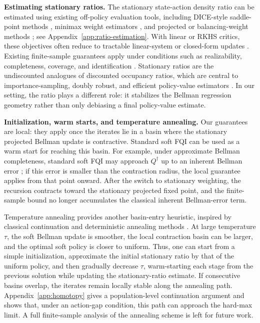 \documentclass{article}
\theoremstyle{plain}
\theoremstyle{definition}
\theoremstyle{remark}
\begin{document}
\textbf{Estimating stationary ratios.}
The stationary state-action density ratio can be estimated using existing
off-policy evaluation tools, including DICE-style saddle-point methods
\citep{liu2018breaking,nachum2019dualdice,nachum2019algaedice,
zhang2020gendice,lee2021optidice,lee2022coptidice}, minimax weight estimators
\citep{uehara2020minimax,uehara2021finite}, and projected or balancing-weight
methods \citep{wang2023projected}; see Appendix~\ref{app:ratio-estimation}.
With linear or RKHS critics, these objectives often reduce to tractable
linear-system or closed-form updates
\citep{dikkala2020minimax,uehara2020minimax,wang2023projected,
olivas2025source}. Existing finite-sample guarantees apply under conditions such
as realizability, completeness, coverage, and identification
\citep{uehara2021finite}. Stationary ratios are the undiscounted analogues of
discounted occupancy ratios, which are central to importance-sampling, doubly
robust, and efficient policy-value estimators
\citep{jiang2016doubly,thomas2016data,kallus2020double,kallus2022efficiently,
amortila2024harnessing}. In our setting, the ratio plays a different role: it
stabilizes the Bellman regression geometry rather than only debiasing a final
policy-value estimate.

\textbf{Initialization, warm starts, and temperature annealing.}
Our guarantees are local: they apply once the iterates lie in a basin where the
stationary projected Bellman update is contractive. Standard soft FQI can be
used as a warm start for reaching this basin. For example, under approximate
Bellman completeness, standard soft FQI may approach \(Q^\dagger\) up to an
inherent Bellman error \citep{munos2008finite}; if this error is smaller than
the contraction radius, the local guarantee applies from that point onward.
After the switch to stationary weighting, the recursion contracts toward the
stationary projected fixed point, and the finite-sample bound no longer
accumulates the classical inherent Bellman-error term.

Temperature annealing provides another basin-entry heuristic, inspired by
classical continuation and deterministic annealing methods
\citep{allgower1990numerical,rose2002deterministic}. At large temperature
\(\tau\), the soft Bellman update is smoother, the local contraction basin can
be larger, and the optimal soft policy is closer to uniform. Thus, one can start
from a simple initialization, approximate the initial stationary ratio by that
of the uniform policy, and then gradually decrease \(\tau\), warm-starting each
stage from the previous solution while updating the stationary-ratio estimate.
If consecutive basins overlap, the iterates remain locally stable along the
annealing path. Appendix~\ref{app:homotopy} gives a population-level
continuation argument and shows that, under an action-gap condition, this path
can approach the hard-max limit. A full finite-sample analysis of the annealing
scheme is left for future work.
\end{document}
